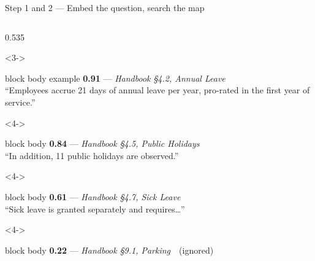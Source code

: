 \documentclass[aspectratio=169,11pt]{beamer}
\begin{document}
\begin{frame}{Step 1 and 2 --- Embed the question, search the map}
\begin{columns}[T,onlytextwidth]
\begin{column}{0.535\textwidth}
      \begin{uncoverenv}<3->
      \begin{beamercolorbox}[sep=5pt,rounded=true]{block body example}
        \scriptsize
        \textbf{0.91} --- \emph{Handbook \S4.2, Annual Leave}\\
        ``Employees accrue 21 days of annual leave per year, pro-rated in the
        first year of service.''
      \end{beamercolorbox}
      \end{uncoverenv}
      \smallskip
      \begin{uncoverenv}<4->
      \begin{beamercolorbox}[sep=5pt,rounded=true]{block body}
        \scriptsize
        \textbf{0.84} --- \emph{Handbook \S4.5, Public Holidays}\\
        ``In addition, 11 public holidays are observed.''
      \end{beamercolorbox}
      \end{uncoverenv}
      \smallskip
      \begin{uncoverenv}<4->
      \begin{beamercolorbox}[sep=5pt,rounded=true]{block body}
        \scriptsize
        \textbf{0.61} --- \emph{Handbook \S4.7, Sick Leave}\\
        ``Sick leave is granted separately and requires\dots''
      \end{beamercolorbox}
      \end{uncoverenv}
      \smallskip
      \begin{uncoverenv}<4->
      \begin{beamercolorbox}[sep=5pt,rounded=true]{block body}
        \scriptsize
        \textbf{0.22} --- \emph{Handbook \S9.1, Parking}\ \ (ignored)
      \end{beamercolorbox}
      \end{uncoverenv}
    \end{column}
  \end{columns}
\end{frame}
\end{document}
